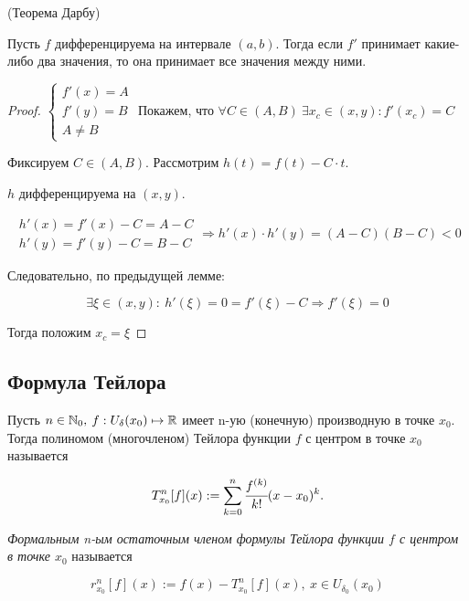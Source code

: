 \begin{theorem}
	\hypertarget{thrm6.5}{(Теорема Дарбу)} Пусть $f$ дифференцируема на интервале $(a, b)$. Тогда если $f'$ принимает какие-либо два значения, то она принимает все значения между ними.  
\end{theorem}
\begin{proof}
	$\begin{cases}
		f'(x) = A \\
		f'(y) = B \\
		A \neq B
	\end{cases}$ Покажем, что $\forall C\in \left(A, B\right) \ \exists x_{c} \in (x,y): f'(x_{c}) = C $
	
	Фиксируем $C \in \left(A, B \right)$. Рассмотрим $h(t) = f(t) - C\cdot t$.
	
	$h$ дифференцируема на $(x,y)$. 
	
	$$\begin{gathered}
		h'(x) = f'(x) - C = A - C \\
		h'(y) = f'(y) - C = B-C
	\end{gathered}
	\Rightarrow h'(x)\cdot h'(y) = \left(A-C\right)\left(B-C\right) < 0 $$
	
	Следовательно, по предыдущей лемме:
	
	$$\exists \xi \in (x,y): \ h'(\xi) = 0 = f'(\xi) - C \Rightarrow f'(\xi) = 0$$
	
	Тогда положим $x_{c} = \xi$
\end{proof}

\subsection{Формула Тейлора}

\begin{definition}
	Пусть $n \in \mathbb{N}_{0},$ $f: U_{\delta}(x_{0})\mapsto \mathbb{R}$ имеет n-ую (конечную) производную в точке $x_{0}$. Тогда \hypertarget{def5.13}{полиномом (многочленом) Тейлора функции $f$ с центром в точке $x_{0}$} называется
	
	$$T_{x_{0}}^{n} [f](x) := \sum\limits_{k = 0}^n \cfrac{f^{(k)}}{k!}(x-x_{0})^{k}.$$ 
\end{definition}

\begin{definition}
	\textit{Формальным n-ым остаточным членом формулы Тейлора функции $f$ с центром в точке $x_{0}$} называется 
	
	$$r_{x_{0}}^{n} [f](x):= f(x) -T_{x_{0}}^{n} [f](x),\ x\in U_{\delta_{0}}(x_{0}) $$
\end{definition}

